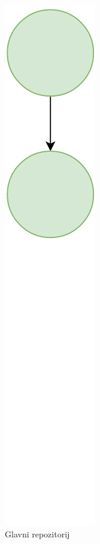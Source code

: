 \documentclass[times, utf8, diplomski, numeric]{fer}
\begin{document}
\begin{figure}[h!]
\centering
\begin{subfigure}{.24\textwidth}
\centering
\includegraphics[scale=0.4]{VersioningTreeA}
\caption{Glavni repozitorij}
\label{fig:VersioningTreeA}
\end{subfigure}
\begin{subfigure}{.24\textwidth}
\centering

\end{subfigure}
\end{figure}
\end{document}
